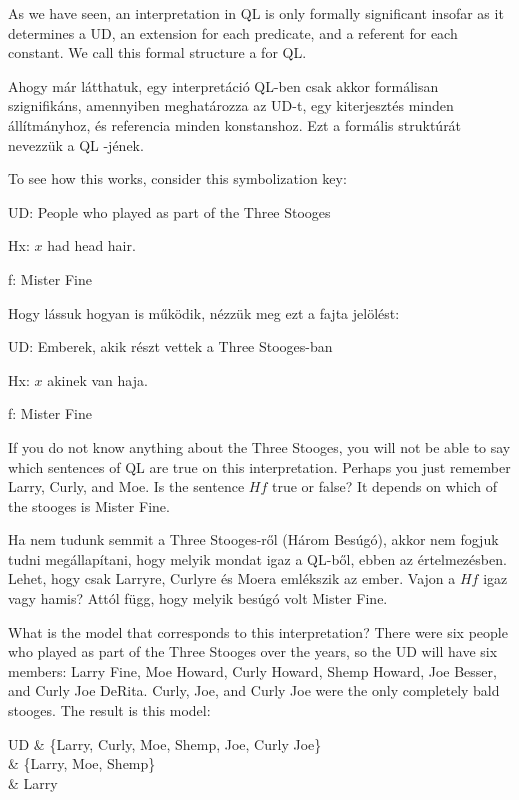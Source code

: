 As we have seen, an interpretation in QL is only formally significant insofar as it determines a UD, an extension for each predicate, and a referent for each constant. We call this formal structure a  for QL.

Ahogy már látthatuk, egy interpretáció QL-ben csak akkor formálisan szignifikáns, amennyiben meghatározza az UD-t, egy kiterjesztés minden állítmányhoz, és referencia minden konstanshoz.  Ezt a formális struktúrát nevezzük a QL  -jének.

To see how this works, consider this symbolization key:
\begin{ekey}
\item[UD:]People who played as part of the Three Stooges
\item[Hx:]$x$ had head hair.
\item[f:] Mister Fine
\end{ekey}

Hogy lássuk hogyan is működik, nézzük meg ezt a fajta jelölést:
\begin{ekey}
\item[UD:]Emberek, akik részt vettek a Three Stooges-ban
\item[Hx:]$x$ akinek van haja.
\item[f:] Mister Fine
\end{ekey}

If you do not know anything about the Three Stooges, you will not be able to say which sentences of QL are true on this interpretation. Perhaps you just remember Larry, Curly, and Moe. Is the sentence $Hf$ true or false? It depends on which of the stooges is Mister Fine.

Ha nem tudunk semmit a Three Stooges-ről (Három Besúgó), akkor nem fogjuk tudni megállapítani, hogy melyik mondat igaz a QL-ből, ebben az értelmezésben. Lehet, hogy csak Larryre, Curlyre és Moera emlékszik az ember. Vajon a $Hf$ igaz vagy hamis? Attól függ, hogy melyik besúgó volt Mister Fine.



What is the model that corresponds to this interpretation? There were six people who played as part of the Three Stooges over the years, so the UD will have six members: Larry Fine, Moe Howard, Curly Howard, Shemp Howard, Joe Besser, and Curly Joe DeRita. Curly, Joe, and Curly Joe were the only completely bald stooges. The result is this model:
\begin{partialmodel}
	UD & \{Larry, Curly, Moe, Shemp, Joe, Curly Joe\}\\
	 & \{Larry, Moe, Shemp\}\\
	 & Larry
\end{partialmodel}


